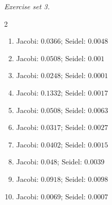 \par\noindent\emph{Exercise set 3.}\nopagebreak
\begin{multicols}{2}\raggedright
\begin{enumerate}[label=\arabic*., leftmargin=*, itemsep=1pt]
\item Jacobi: $0.0366$; Seidel: $0.0048$
\item Jacobi: $0.0508$; Seidel: $0.001$
\item Jacobi: $0.0248$; Seidel: $0.0001$
\item Jacobi: $0.1332$; Seidel: $0.0017$
\item Jacobi: $0.0508$; Seidel: $0.0063$
\item Jacobi: $0.0317$; Seidel: $0.0027$
\item Jacobi: $0.0402$; Seidel: $0.0015$
\item Jacobi: $0.048$; Seidel: $0.0039$
\item Jacobi: $0.0918$; Seidel: $0.0098$
\item Jacobi: $0.0069$; Seidel: $0.0007$
\end{enumerate}
\end{multicols}
